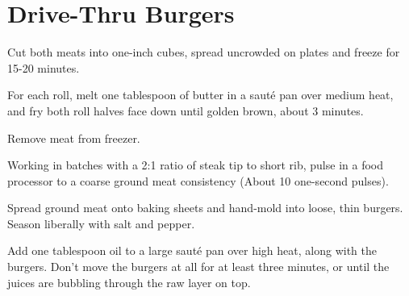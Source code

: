 

\section{Drive-Thru Burgers}
\begin{recipe}



Cut both meats into one-inch cubes, spread uncrowded on plates and freeze for 15-20 minutes.

\columnbreak


For each roll, melt one tablespoon of butter in a sauté pan over medium heat, and fry both roll halves face down until golden brown, about 3 minutes.

Remove meat from freezer.

Working in batches with a 2:1 ratio of steak tip to short rib, pulse in a food processor to a coarse ground meat consistency (About 10 one-second pulses).

Spread ground meat onto baking sheets and hand-mold into loose, thin burgers. Season liberally with salt and pepper.


Add one tablespoon oil to a large sauté pan over high heat, along with the burgers. Don't move the burgers at all for at least three minutes, or until the juices are bubbling through the raw layer on top.


\end{recipe}

